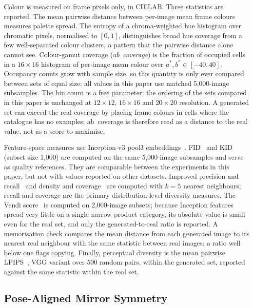 \documentclass[electronics,article,submit,pdftex,moreauthors]{Definitions/mdpi}
\begin{document}
Colour is measured on frame pixels only, in CIELAB. Three statistics are
reported. The mean pairwise distance between per-image mean frame colours
measures palette spread. The entropy of a chroma-weighted hue histogram
over chromatic pixels, normalised to $[0, 1]$, distinguishes broad hue
coverage from a few well-separated colour clusters, a pattern that the
pairwise distance alone cannot see. Colour-gamut coverage
(\emph{ab~coverage}) is the fraction of occupied cells in a $16 \times 16$
histogram of per-image mean colour over $a^*, b^* \in [-40, 40]$.
Occupancy counts grow with sample size, so this quantity is only ever
compared between sets of equal size; all values in this paper use matched
5,000-image subsamples. The bin count is a free parameter; the
ordering of the sets compared in this paper is unchanged at
$12 \times 12$, $16 \times 16$ and $20 \times 20$ resolution. A generated
set can exceed the real coverage by placing frame colours in cells where
the catalogue has no examples; ab~coverage is therefore read as a
distance to the real value, not as a score to maximise.

Feature-space measures use Inception-v3 pool3
embeddings~\cite{szegedy2016inception}. FID~\cite{heusel2017fid} and KID~\cite{binkowski2018kid} (subset size 1,000)
are computed on the same 5,000-image subsamples and serve as quality
references. They are comparable between the experiments in this paper, but
not with values reported on other datasets. Improved
precision and recall~\cite{kynkaanniemi2019precision} and density and
coverage~\cite{naeem2020prdc} are computed with $k = 5$ nearest
neighbours; recall and coverage are the primary distribution-level
diversity measures. The Vendi score~\cite{friedman2023vendi} is computed
on 2,000-image subsets; because Inception features spread very little on
a single narrow product category, its absolute value is small even for
the real set, and only the generated-to-real ratio is reported. A
memorisation check compares the mean distance from each generated image
to its nearest real neighbour with the same statistic between real images;
a ratio well below one flags copying. Finally, perceptual diversity is the mean pairwise
LPIPS~\cite{zhang2018lpips}, VGG variant over 500 random pairs, within the
generated set, reported against the same statistic within the real set.

\subsection{Pose-Aligned Mirror Symmetry}
\label{subsec:aligned_sym}
\end{document}
